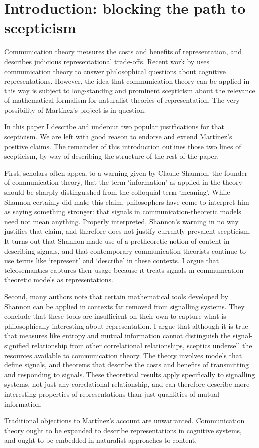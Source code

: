 \section{Introduction: blocking the path to scepticism}\label{sec:intro}

Communication theory measures the costs and benefits of representation, and describes judicious representational trade-offs. 
Recent work by \citet{martinez2019representations} uses communication theory to answer philosophical questions about cognitive representations.
However, the idea that communication theory can be applied in this way is subject to long-standing and prominent scepticism about the relevance of mathematical formalism for naturalist theories of representation.
The very possibility of Mart\'{i}nez's project is in question.

In this paper I describe and undercut two popular justifications for that scepticism.
We are left with good reason to endorse and extend Mart\'{i}nez's positive claims.
The remainder of this introduction outlines those two lines of scepticism, by way of describing the structure of the rest of the paper.

First, scholars often appeal to a warning given by Claude Shannon, the founder of communication theory, that the term `information' as applied in the theory should be sharply distinguished from the colloquial term `meaning'.
While Shannon certainly did make this claim, philosophers have come to interpret him as saying something stronger: that signals in communication-theoretic models need not mean anything.
Properly interpreted, Shannon's warning in no way justifies that claim, and therefore does not justify currently prevalent scepticism.
It turns out that Shannon made use of a pretheoretic notion of content in describing signals, and that contemporary communication theorists continue to use terms like `represent' and `describe' in these contexts.
I argue that teleosemantics captures their usage because it treats signals in communication-theoretic models as representations.

Second, many authors note that certain mathematical tools developed by Shannon can be applied in contexts far removed from signalling systems.
They conclude that these tools are insufficient on their own to capture what is philosophically interesting about representation.
I argue that although it is true that measures like entropy and mutual information cannot distinguish the signal-signified relationship from other correlational relationships, sceptics undersell the resources available to communication theory.
The theory involves models that define signals, and theorems that describe the costs and benefits of transmitting and responding to signals.
These theoretical results apply specifically to signalling systems, not just any correlational relationship, and can therefore describe more interesting properties of representations than just quantities of mutual information.

Traditional objections to Mart\'{i}nez's account are unwarranted.
Communication theory ought to be expanded to describe representations in cognitive systems, and ought to be embedded in naturalist approaches to content.
